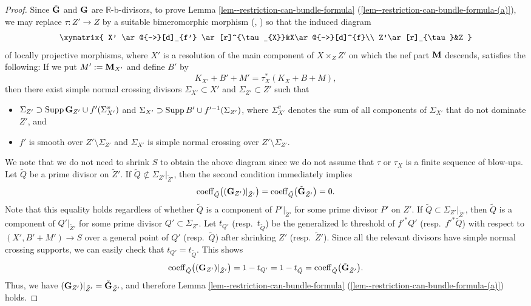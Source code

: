 \documentclass[12pt]{amsart}
\theoremstyle{definition}
\begin{document}
\begin{proof}
Since $\tilde{\boldsymbol{\rm G}}$ and $\boldsymbol{\rm G}$ are $\mathbb{R}$-b-divisors, to prove Lemma \ref{lem--restriction-can-bundle-formula} (\ref{lem--restriction-can-bundle-formula-(a)}), we may replace $\tau \colon Z' \to Z$ by a suitable bimeromorphic morphism (\cite[Corollary 2]{hironaka-flattening}, \cite[Theorem 13.2]{resolution-1}) so that the induced diagram 
 $$
\xymatrix{
X' \ar@{->}[d]_{f'} \ar[r]^{\tau_{X}}&X\ar@{->}[d]^{f}\\
Z'\ar[r]_{\tau}&Z
}
$$
of locally projective morphisms, where $X'$ is a resolution of the main component of $X \times_{Z}Z'$ on which the nef part $\boldsymbol{\rm M}$ descends, satisfies the following: 
If we put $M':=\boldsymbol{\rm M}_{X'}$ and define $B'$ by
$$K_{X'}+B'+M'=\tau_{X}^{*}(K_{X}+B+M),$$
then there exist simple normal crossing divisors $\Sigma_{X'} \subset X'$ and $\Sigma_{Z'} \subset Z'$ such that
\begin{itemize}
\item
 $\Sigma_{Z'}\supset {\rm Supp}\,\boldsymbol{\rm G}_{Z'} \cup f'(\Sigma_{X'}^{v})$ and $\Sigma_{X'} \supset {\rm Supp}\,B' \cup f'^{-1 }(\Sigma_{Z'})$, where $\Sigma_{X'}^{v}$ denotes the sum of all components of $\Sigma_{X'}$ that do not dominate $Z'$, and
\item
$f'$ is smooth over  $Z' \setminus \Sigma_{Z'}$ and $\Sigma_{X'}$ is simple normal crossing over $Z' \setminus \Sigma_{Z'}$. 
\end{itemize}
We note that we do not need to shrink $S$ to obtain the above diagram since we do not assume that $\tau$ or $\tau_{X}$ is a finite sequence of blow-ups. 
Let $\tilde{Q}$ be a prime divisor on $\tilde{Z}'$. 
If ${\tilde{Q}} \not\subset \Sigma_{Z'}|_{\tilde{Z}'}$, then the second condition immediately implies 
$${\rm coeff}_{\tilde{Q}}\bigl((\boldsymbol{\rm G}_{Z'})|_{\tilde{Z}'}\bigr)={\rm coeff}_{\tilde{Q}}\bigl(\tilde{\boldsymbol{\rm G}}_{\tilde{Z}'}\bigr)=0.$$
Note that this equality holds regardless of whether $\tilde{Q}$ is a component of $P'|_{\tilde{Z}'}$ for some prime divisor $P'$ on $Z'$. 
If ${\tilde{Q}} \subset \Sigma_{Z'}|_{\tilde{Z}'}$, then $\tilde{Q}$ is a component of $Q'|_{\tilde{Z}'}$ for some prime divisor $Q' \subset \Sigma_{Z'}$. 
Let $t_{Q'}$ (resp.~$t_{\tilde{Q}}$) be the generalized lc threshold of $f'^{*}Q'$ (resp.~$f'^{*}\tilde{Q}$) with respect to $(X',B'+M') \to S$ over a general point of $Q'$ (resp.~$\tilde{Q}$) after shrinking $Z'$ (resp.~$\tilde{Z}'$). 
Since all the relevant divisors have simple normal crossing supports, we can easily check that $t_{Q'}=t_{\tilde{Q}}$. 
This shows 
$${\rm coeff}_{\tilde{Q}}\bigl((\boldsymbol{\rm G}_{Z'})|_{\tilde{Z}'}\bigr)= 1-t_{Q'} = 1-t_{\tilde{Q}} ={\rm coeff}_{\tilde{Q}}\bigl(\tilde{\boldsymbol{\rm G}}_{\tilde{Z}'}\bigr).$$
Thus, we have $(\boldsymbol{\rm G}_{Z'})|_{\tilde{Z}'}=\tilde{\boldsymbol{\rm G}}_{\tilde{Z}'}$, and therefore Lemma \ref{lem--restriction-can-bundle-formula} (\ref{lem--restriction-can-bundle-formula-(a)}) holds. 


\end{proof}
\end{document}
